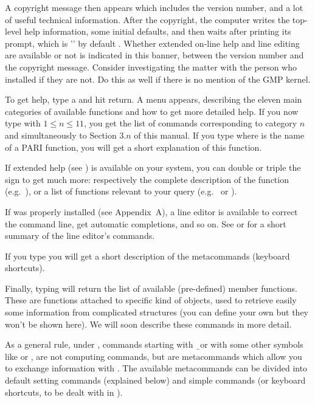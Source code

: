 A copyright message then appears which includes the version number, and a lot
of useful technical information. After the copyright, the computer writes the
top-level help information, some initial defaults, and then waits after
printing its prompt, which is '' by default . Whether extended
on-line help and line editing are available or not is indicated in this
 banner, between the version number and the copyright message.
Consider investigating the matter with the person who installed  if
they are not. Do this as well if there is no mention of the GMP kernel.


To get help, type a  and hit return. A menu appears, describing the
eleven main categories of available functions and how to get more detailed
help. If you now type  with $1\le n\le11$, you get the list of
commands corresponding to category $n$ and simultaneously to Section $3.n$ of
this manual. If you type  where 
is the name of a PARI function, you will get a short explanation of this
function.

If extended help (see ) is available on your system,
you can double or triple the  sign to get much more: respectively the
complete description of the function (e.g.~), or a list of
 functions relevant to your query (e.g.~ 
or ).

If  was properly installed (see Appendix~A), a line editor is
available to correct the command line, get automatic completions, and so on.
See  or  for a short summary of the line
editor's commands.

If you type  you will get a short description of the metacommands
(keyboard shortcuts).

Finally, typing  will return the list of available (pre-defined)
member functions. These are functions attached to specific kind of objects,
used to retrieve easily some information from complicated structures (you can
define your own but they won't be shown here). We will soon describe these
commands in more detail.

As a general rule, under , commands starting with \b\ or with some
other symbols like  or \kbd{\#}, are not computing commands, but are
metacommands which allow you to exchange information with . The
available metacommands can be divided into default setting commands
(explained below) and simple commands (or keyboard shortcuts, to be dealt
with in ).

